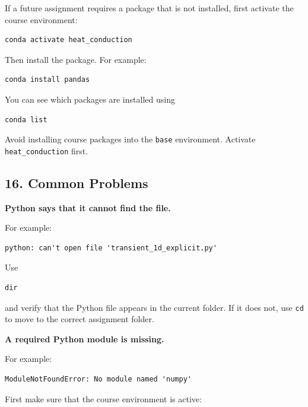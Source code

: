 \documentclass[11pt]{article}
\begin{document}
If a future assignment requires a package that is not installed, first
activate the course environment:

\begin{lstlisting}
conda activate heat_conduction
\end{lstlisting}

Then install the package. For example:

\begin{lstlisting}
conda install pandas
\end{lstlisting}

You can see which packages are installed using

\begin{lstlisting}
conda list
\end{lstlisting}

Avoid installing course packages into the \texttt{base} environment.
Activate \texttt{heat\_conduction} first.

\subsection*{16. Common Problems}

\textbf{Python says that it cannot find the file.}

For example:

\begin{lstlisting}
python: can't open file 'transient_1d_explicit.py'
\end{lstlisting}

Use

\begin{lstlisting}
dir
\end{lstlisting}

and verify that the Python file appears in the current folder. If it
does not, use \texttt{cd} to move to the correct assignment folder.

\vspace{5pt}

\textbf{A required Python module is missing.}

For example:

\begin{lstlisting}
ModuleNotFoundError: No module named 'numpy'
\end{lstlisting}

First make sure that the course environment is active:
\end{document}
